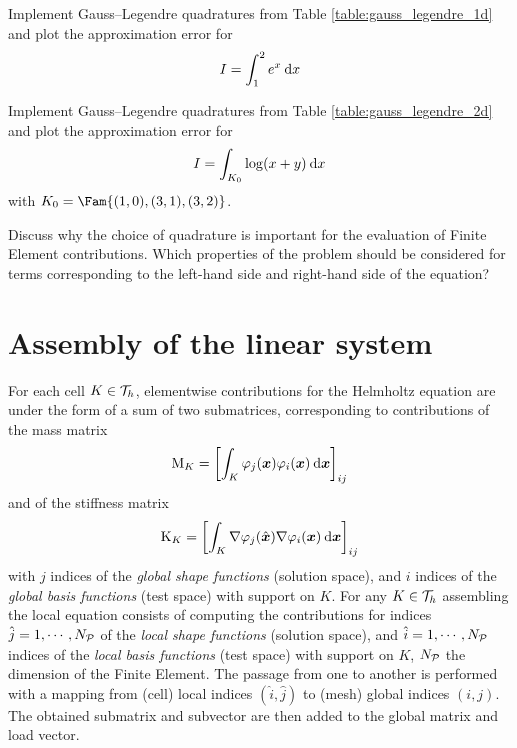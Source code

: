 \documentclass[assignment]{tmanotes}
\begin{document}

\medskip
\begin{tmatsks}
\item Implement Gauss--Legendre quadratures from Table \ref{table:gauss_legendre_1d} and plot the approximation error for
\[
I = \int_1^2 e^x \hspace{.5ex}{\mathrm d} x
\]
\item Implement Gauss--Legendre quadratures from Table \ref{table:gauss_legendre_2d} and plot the approximation error for
\[
I = \int_{K_0} \log(x+y) \hspace{.5ex}{\mathrm d} x
\]
with $K_0 = \Fam{ (1,0), (3,1), (3,2)}$.
\item Discuss why the choice of quadrature is important for the evaluation of Finite Element contributions. Which properties of the problem should be considered for terms corresponding to the left-hand side and right-hand side of the equation?
\end{tmatsks}

\section{Assembly of the linear system}

For each cell $K \in {\mathcal T}_h$, elementwise contributions for the Helmholtz equation are under the form of a sum of two submatrices, corresponding to contributions of the mass matrix
\[
{\mathrm M}_K =  \left[\int_K \varphi_j({{\boldsymbol x}}) \varphi_i({{\boldsymbol x}}) \hspace{.5ex}{\mathrm d}{{\boldsymbol x}}\right]_{i j}
\]
and of the stiffness matrix
\[
{\mathrm K}_K = \left[\int_K \nabla\varphi_j(\hat{{\boldsymbol x}}) \nabla\varphi_i({{\boldsymbol x}}) \hspace{.5ex}{\mathrm d}{{\boldsymbol x}}\right]_{ij}
\]
with $j$ indices of the \textit{global shape functions} (solution space), and $i$ indices of the \textit{global basis functions} (test space) with support on $K$.
For any $K\in{\mathcal T}_h$ assembling the local equation consists of computing the contributions for indices $\hat j = 1,\cdots,N_{\mathcal P}$  of the \textit{local shape functions} (solution space), and $\hat i = 1,\cdots,N_{\mathcal P}$ indices of the \textit{local basis functions} (test space) with support on $K$, $N_{\mathcal P}$ the dimension of the Finite Element.
The passage from one to another is performed with a mapping from (cell) local indices $(\hat i, \hat j)$ to (mesh) global indices $(i, j)$.
The obtained submatrix and subvector are then added to the global matrix and load vector.
\end{document}
